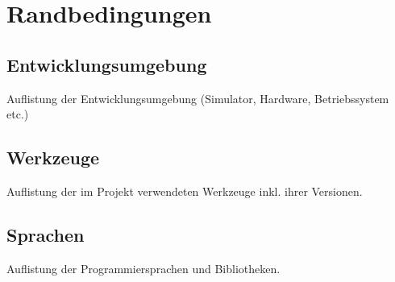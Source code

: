 \chapter{Randbedingungen}

\section{Entwicklungsumgebung}

Auflistung der Entwicklungsumgebung (Simulator, Hardware, Betriebssystem
etc.)

\section{Werkzeuge}

Auflistung der im Projekt verwendeten Werkzeuge inkl. ihrer Versionen.

\section{Sprachen}

Auflistung der Programmiersprachen und Bibliotheken.
